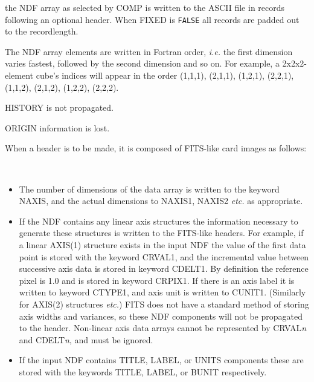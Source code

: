 \documentclass[twoside,11pt]{article}
\newcommand{\latex}[1]{#1}
\newcommand{\ssthitemlist}[1]{
  \latex{
  \mbox{} \\
  \vspace{-3.5ex}
  }
  \begin{itemize}
     #1
  \end{itemize}
}
\newcommand{\sstitem}{\item}
\newcommand{\sstitem}{\item}
\begin{document}
{{{         \sstitem
            the NDF array as selected by COMP is written to the ASCII
            file in records following an optional header.  When FIXED is
            \texttt{FALSE} all records are padded out to the recordlength.

         \sstitem
            The NDF array elements are written in Fortran order, \emph{i.e.}
            the first dimension varies fastest, followed by the second 
            dimension and so on.  For example, a 2x2x2-element cube's
            indices will appear in the order (1,1,1), (2,1,1), (1,2,1), 
            (2,2,1), (1,1,2), (2,1,2), (1,2,2), (2,2,2).

         \sstitem
            HISTORY is not propagated.

         \sstitem
            ORIGIN information is lost.

         \sstitem
            When a header is to be made, it is composed of FITS-like card
            images as follows:
         \ssthitemlist{

            \sstitem
               The number of dimensions of the data array is written
               to the keyword NAXIS, and the actual dimensions to NAXIS1,
               NAXIS2 {\it etc.} as appropriate.

            \sstitem
               If the NDF contains any linear axis structures the
               information necessary to generate these structures is
               written to the FITS-like headers. For example, if a linear
               AXIS(1) structure exists in the input NDF the value of the
               first data point is stored with the keyword CRVAL1,
               and the incremental value between successive axis data is
               stored in keyword CDELT1.  By definition the reference pixel is
               1.0 and is stored in keyword CRPIX1.  If there is an axis label
               it is written to keyword CTYPE1, and axis unit is written to CUNIT1.
               (Similarly for AXIS(2) structures {\it etc.}) FITS does not have
               a standard method of storing axis widths and variances, so these
               NDF components will not be propagated to the header.
               Non-linear axis data arrays cannot be represented by CRVAL{\em{n}}
               and CDELT{\em{n}}, and must be ignored.

            \sstitem
               If the input NDF contains TITLE, LABEL, or UNITS components
               these are stored with the keywords TITLE, LABEL, or BUNIT
               respectively.

}}}}
\end{document}
